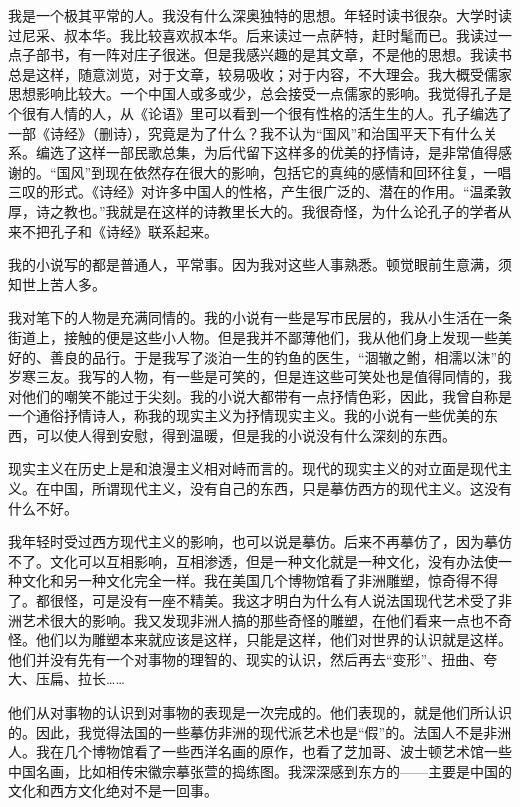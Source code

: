 \documentclass[12pt,a5paper]{ctexbook}
\begin{document}
我是一个极其平常的人。我没有什么深奥独特的思想。年轻时读书很杂。大学时读过尼采、叔本华。我比较喜欢叔本华。后来读过一点萨特，赶时髦而已。我读过一点子部书，有一阵对庄子很迷。但是我感兴趣的是其文章，不是他的思想。我读书总是这样，随意浏览，对于文章，较易吸收；对于内容，不大理会。我大概受儒家思想影响比较大。一个中国人或多或少，总会接受一点儒家的影响。我觉得孔子是个很有人情的人，从《论语》里可以看到一个很有性格的活生生的人。孔子编选了一部《诗经》（删诗），究竟是为了什么？我不认为“国风”和治国平天下有什么关系。编选了这样一部民歌总集，为后代留下这样多的优美的抒情诗，是非常值得感谢的。“国风”到现在依然存在很大的影响，包括它的真纯的感情和回环往复，一唱三叹的形式。《诗经》对许多中国人的性格，产生很广泛的、潜在的作用。“温柔敦厚，诗之教也。”我就是在这样的诗教里长大的。我很奇怪，为什么论孔子的学者从来不把孔子和《诗经》联系起来。

我的小说写的都是普通人，平常事。因为我对这些人事熟悉。顿觉眼前生意满，须知世上苦人多。

我对笔下的人物是充满同情的。我的小说有一些是写市民层的，我从小生活在一条街道上，接触的便是这些小人物。但是我并不鄙薄他们，我从他们身上发现一些美好的、善良的品行。于是我写了淡泊一生的钓鱼的医生，“涸辙之鲋，相濡以沫”的岁寒三友。我写的人物，有一些是可笑的，但是连这些可笑处也是值得同情的，我对他们的嘲笑不能过于尖刻。我的小说大都带有一点抒情色彩，因此，我曾自称是一个通俗抒情诗人，称我的现实主义为抒情现实主义。我的小说有一些优美的东西，可以使人得到安慰，得到温暖，但是我的小说没有什么深刻的东西。

现实主义在历史上是和浪漫主义相对峙而言的。现代的现实主义的对立面是现代主义。在中国，所谓现代主义，没有自己的东西，只是摹仿西方的现代主义。这没有什么不好。

我年轻时受过西方现代主义的影响，也可以说是摹仿。后来不再摹仿了，因为摹仿不了。文化可以互相影响，互相渗透，但是一种文化就是一种文化，没有办法使一种文化和另一种文化完全一样。我在美国几个博物馆看了非洲雕塑，惊奇得不得了。都很怪，可是没有一座不精美。我这才明白为什么有人说法国现代艺术受了非洲艺术很大的影响。我又发现非洲人搞的那些奇怪的雕塑，在他们看来一点也不奇怪。他们以为雕塑本来就应该是这样，只能是这样，他们对世界的认识就是这样。他们并没有先有一个对事物的理智的、现实的认识，然后再去“变形”、扭曲、夸大、压扁、拉长……

他们从对事物的认识到对事物的表现是一次完成的。他们表现的，就是他们所认识的。因此，我觉得法国的一些摹仿非洲的现代派艺术也是“假”的。法国人不是非洲人。我在几个博物馆看了一些西洋名画的原作，也看了芝加哥、波士顿艺术馆一些中国名画，比如相传宋徽宗摹张萱的捣练图。我深深感到东方的——主要是中国的文化和西方文化绝对不是一回事。
\end{document}
